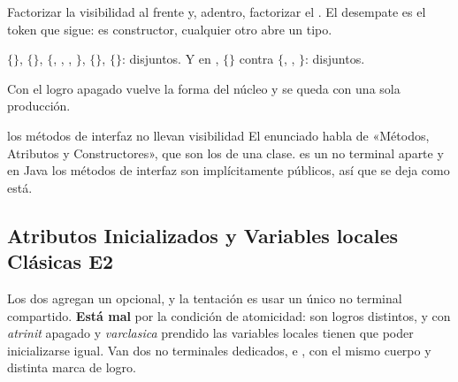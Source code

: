  Factorizar la visibilidad al frente y, adentro, factorizar el .
El desempate es el token que sigue: \tl{(} es constructor, cualquier otro abre un tipo.
\begin{producciones}
\end{producciones}
$\{$$\}$, $\{$$\}$, $\{$, , , $\}$,
$\{$$\}$, $\{$$\}$: disjuntos. Y en , $\{$\tl{(}$\}$
contra $\{$\tl{<}, \tl{[}, $\}$: disjuntos.

Con el logro apagado vuelve la forma del núcleo y  se queda con una sola
producción.

\begin{decision}{los métodos de interfaz no llevan visibilidad}
El enunciado habla de «Métodos, Atributos y Constructores», que son los  de una clase.
 es un no terminal aparte y en Java los métodos de interfaz son implícitamente
públicos, así que se deja como está.
\end{decision}

\subsection{Atributos Inicializados y Variables locales Clásicas E2}
\label{sec:logro-inicializaciones}

Los dos agregan un \tl{=}  opcional, y la tentación es usar un único no
terminal compartido. \textbf{Está mal} por la condición de atomicidad: son logros distintos, y con
\emph{atrinit} apagado y \emph{varclasica} prendido las variables locales tienen que poder
inicializarse igual. Van dos no terminales dedicados,  e
, con el mismo cuerpo y distinta marca de logro.

